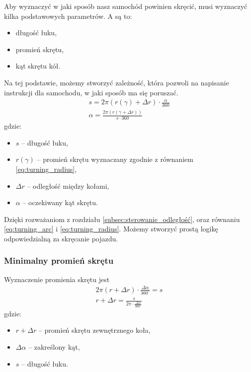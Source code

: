         Aby wyznaczyć w jaki sposób nasz samochód powinien skręcić, musi wyznaczyć kilka podstawowych parametrów.
        A są to:
        \begin{itemize}
            \item długość łuku,
            \item promień skrętu,
            \item kąt skrętu kół.
        \end{itemize}
        Na tej podstawie, możemy stworzyć zależność, która pozwoli na napisanie instrukcji dla samochodu, w jaki sposób ma się poruszać.
        \begin{gather}
            s = 2\pi (r(\gamma) + \Delta r) \cdot \frac{\alpha}{360}
            \label{eq:turning_arc}
            \\
            \alpha = \frac{2\pi (r(\gamma + \Delta r))}{s \cdot 360}
        \end{gather}
        gdzie:
        \begin{itemize}
            \item $s$ -- długość łuku,
            \item $r(\gamma)$ -- promień skrętu wyznaczany zgodnie z równaniem \eqref{eq:turning_radius},
            \item $\Delta r$ -- odległość między kołami,
            \item $\alpha$ -- oczekiwany kąt skrętu.
        \end{itemize}

        Dzięki rozważaniom z rozdziału \ref{subsec:sterowanie_odległość}, oraz równaniu \eqref{eq:turning_arc} i \eqref{eq:turning_radius}.
        Możemy stworzyć prostą logikę odpowiedzialną za skręcanie pojazdu.


        \subsubsection{Minimalny promień skrętu}
        \label{subsubsec:minamalny_promien}
            Wyznaczenie promienia skrętu jest 
            \begin{gather}
                2\pi (r + \Delta r) \cdot \frac{\Delta \alpha}{360^\circ} = s\\
                r + \Delta r = \frac{s}{2\pi \cdot \frac{\Delta \alpha}{360^\circ}}
            \end{gather}
            gdzie:
            \begin{itemize}
                \item $r + \Delta r$ -- promień skrętu zewnętrznego koła,
                \item $\Delta \alpha$ -- zakreślony kąt,
                \item $s$ -- długość łuku.
            \end{itemize}

